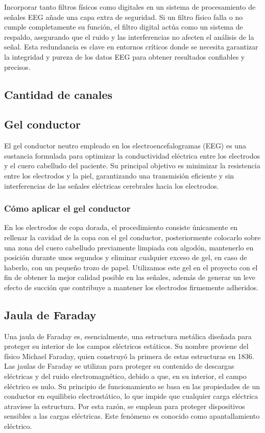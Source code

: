 \documentclass{article}
\begin{document}
\begin{enumerate}
    Incorporar tanto filtros físicos como digitales en un sistema de procesamiento de señales EEG añade una capa extra de seguridad. Si un filtro físico falla o no cumple completamente su función, el filtro digital actúa como un sistema de respaldo, asegurando que el ruido y las interferencias no afecten el análisis de la señal. Esta redundancia es clave en entornos críticos donde se necesita garantizar la integridad y pureza de los datos EEG para obtener resultados confiables y precisos.
\end{enumerate}


\subsection{Cantidad de canales}

\subsection{Gel conductor}
El gel conductor neutro empleado en los electroencefalogramas (EEG) es una sustancia formulada para optimizar la conductividad eléctrica entre los electrodos y el cuero cabelludo del paciente. Su principal objetivo es minimizar la resistencia entre los electrodos y la piel, garantizando una transmisión eficiente y sin interferencias de las señales eléctricas cerebrales hacia los electrodos. 

\subsubsection{Cómo aplicar el gel conductor}
En los electrodos de copa dorada, el procedimiento consiste únicamente en rellenar la cavidad de la copa con el gel conductor, posteriormente colocarlo sobre una zona del cuero cabelludo previamente limpiada con algodón, mantenerlo en posición durante unos segundos y eliminar cualquier exceso de gel, en caso de haberlo, con un pequeño trozo de papel. Utilizamos este gel en el proyecto con el fin de obtener la mejor calidad posible en las señales, además de generar un leve efecto de succión que contribuye a mantener los electrodos firmemente adheridos.

\subsection{Jaula de Faraday}
Una jaula de Faraday es, esencialmente, una estructura metálica diseñada para proteger su interior de los campos eléctricos estáticos. Su nombre proviene del físico Michael Faraday, quien construyó la primera de estas estructuras en 1836. Las jaulas de Faraday se utilizan para proteger su contenido de descargas eléctricas y del ruido electromagnético, debido a que, en su interior, el campo eléctrico es nulo. Su principio de funcionamiento se basa en las propiedades de un conductor en equilibrio electrostático, lo que impide que cualquier carga eléctrica atraviese la estructura. Por esta razón, se emplean para proteger dispositivos sensibles a las cargas eléctricas. Este fenómeno es conocido como apantallamiento eléctrico.
\end{document}
